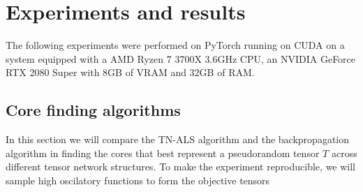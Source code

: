 \documentclass[11pt,a4paper,openright,oneside]{book}
\numberwithin{equation}{section}
\begin{document}
{\normalfont


\newpage

\printbibliography

\appendix
\chapter{Experiments and results}

The following experiments were performed on PyTorch running on CUDA on a system
equipped with a AMD Ryzen 7 3700X 3.6GHz CPU, an NVIDIA GeForce RTX 2080 Super with 8GB of VRAM and
32GB of RAM.

\section{Core finding algorithms} \label{core-finding-algorithms}
In this section we will compare the TN-ALS algorithm and the backpropagation algorithm in finding the cores that
best represent a pseudorandom tensor $T$ across different tensor network structures. To make the experiment reproducible,
we will sample high oscilatory functions to form the objective tensors

\begin{figure}[H]


\end{figure}}
\end{document}
